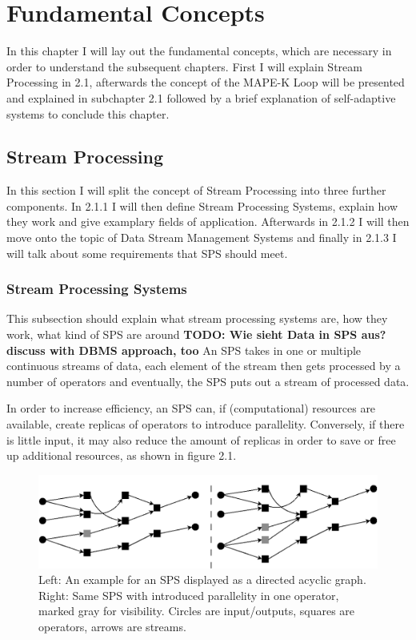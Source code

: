 \chapter{Fundamental Concepts}
In this chapter I will lay out the fundamental concepts, which are necessary in order to understand the subsequent chapters.
First I will explain Stream Processing in 2.1, afterwards the concept of the MAPE-K Loop will be presented and explained in subchapter 2.1 
followed by a brief explanation of self-adaptive systems to conclude this chapter.

    \section{Stream Processing}
    In this section I will split the concept of Stream Processing into three further components.
    In 2.1.1 I will then define Stream Processing Systems, explain how they work and give examplary fields of application.
    Afterwards in 2.1.2 I will then move onto the topic of Data Stream Management Systems and finally in 2.1.3 I will talk about
    some requirements that SPS should meet.
    
        \subsection{Stream Processing Systems}
        This subsection should explain what stream processing systems are, how they work, what kind of SPS are around
        \textbf{TODO: Wie sieht Data in SPS aus? discuss with DBMS approach, too}
        An SPS takes in one or multiple continuous streams of data, each element of the stream then gets processed by a number of operators and eventually, 
        the SPS puts out a stream of processed data.
    
        In order to increase efficiency, an SPS can, if (computational) resources are available, create replicas of operators to introduce parallelity. 
        Conversely, if there is little input, it may also reduce the amount of replicas in order to save or free up additional resources, as shown in figure 2.1.
        \begin{figure}[h]
        \centering
        \includegraphics[width=1.0\textwidth]{Bilder/sps_parallel_normal.png}
        \caption{
                Left: An example for an SPS displayed as a directed acyclic graph. 
                Right: Same SPS with introduced parallelity in one operator, marked gray for visibility. 
                Circles are input/outputs, squares are operators, arrows are streams.
                }
        \label{fig:sps_parallel_normal}
        \end{figure}

